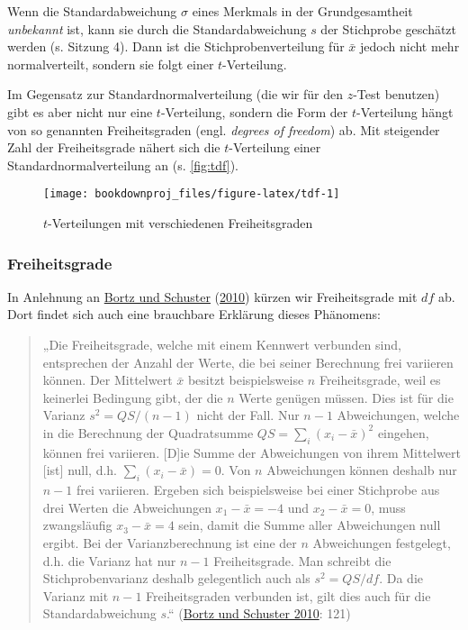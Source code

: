 \documentclass[
  ngerman,
]{article}
\begin{document}
Wenn die Standardabweichung \(\sigma\) eines Merkmals in der Grundgesamtheit \emph{unbekannt} ist, kann sie durch die Standardabweichung \(s\) der Stichprobe geschätzt werden (s. Sitzung 4). Dann ist die Stichprobenverteilung für \(\bar{x}\) jedoch nicht mehr normalverteilt, sondern sie folgt einer \(t\)-Verteilung.

Im Gegensatz zur Standardnormalverteilung (die wir für den \(z\)-Test benutzen) gibt es aber nicht nur eine \(t\)-Verteilung, sondern die Form der \(t\)-Verteilung hängt von so genannten Freiheitsgraden (engl. \emph{degrees of freedom}) ab. Mit steigender Zahl der Freiheitsgrade nähert sich die \(t\)-Verteilung einer Standardnormalverteilung an (s. \autoref{fig:tdf}).

\begin{figure}[h]

{\centering \texttt{[image: bookdownproj\_files/figure-latex/tdf-1]} 

}

\caption{$t$-Verteilungen mit verschiedenen Freiheitsgraden}\label{fig:tdf}
\end{figure}

\hypertarget{freiheitsgrade}{%
\subsubsection{Freiheitsgrade}\label{freiheitsgrade}}

In Anlehnung an \protect\hyperlink{ref-bortz}{Bortz und Schuster} (\protect\hyperlink{ref-bortz}{2010}) kürzen wir Freiheitsgrade mit \(\mathit{df}\) ab. Dort findet sich auch eine brauchbare Erklärung dieses Phänomens:

\begin{quote}
„Die Freiheitsgrade, welche mit einem Kennwert verbunden sind, entsprechen der Anzahl der Werte, die bei seiner Berechnung frei variieren können. Der Mittelwert \(\bar{x}\) besitzt beispielsweise \(n\) Freiheitsgrade, weil es keinerlei Bedingung gibt, der die \(n\) Werte genügen müssen. Dies ist für die Varianz \(s^2=\mathit{QS}/(n-1)\) nicht der Fall. Nur \(n-1\) Abweichungen, welche in die Berechnung der Quadratsumme \(\mathit{QS}=\sum_i(x_i-\bar{x})^2\) eingehen, können frei variieren. {[}D{]}ie Summe der Abweichungen von ihrem Mittelwert {[}ist{]} null, d.h. \(\sum_i(x_i-\bar{x})=0\). Von \(n\) Abweichungen können deshalb nur \(n - 1\) frei variieren. Ergeben sich beispielsweise bei einer Stichprobe aus drei Werten die Abweichungen \(x_1 - \bar{x} = -4\) und \(x_2 - \bar{x} = 0\), muss zwangsläufig \(x_3 -\bar{x} = 4\) sein, damit die Summe aller Abweichungen null ergibt. Bei der Varianzberechnung ist eine der \(n\) Abweichungen festgelegt, d.h. die Varianz hat nur \(n - 1\) Freiheitsgrade. Man schreibt die Stichprobenvarianz deshalb gelegentlich auch als \(s^2 = \mathit{QS}/\mathit{df}\). Da die Varianz mit \(n - 1\) Freiheitsgraden verbunden ist, gilt dies auch für die Standardabweichung \(s\).`` (\protect\hyperlink{ref-bortz}{Bortz und Schuster 2010}: 121)
\end{quote}
\end{document}

